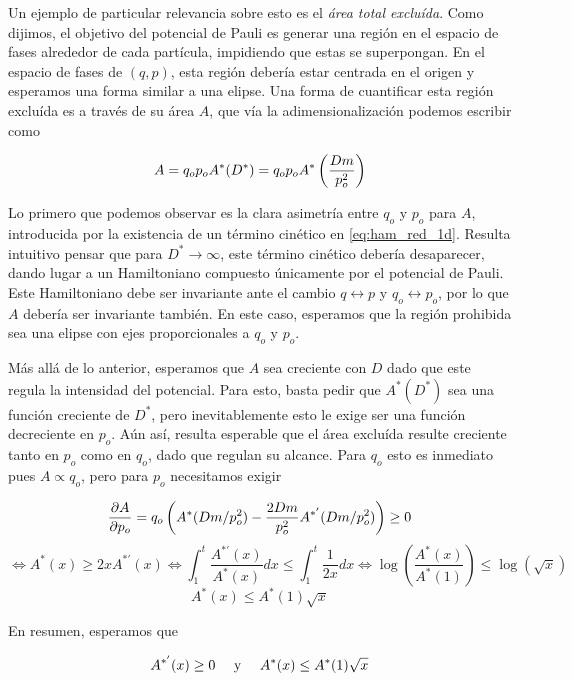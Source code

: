 Un ejemplo de particular relevancia sobre esto es el \textit{área total excluída}.
Como dijimos, el objetivo del potencial de Pauli es generar una región en el espacio de fases alrededor de cada partícula, impidiendo que estas se superpongan.
En el espacio de fases de $(q,p)$, esta región debería estar centrada en el origen y esperamos una forma similar a una elipse.
Una forma de cuantificar esta región excluída es a través de su área $A$, que vía la adimensionalización podemos escribir como

\begin{equation}{\label{eq:area_red}}
A = q_op_oA^*(D^*) = q_op_oA^*\left( \frac{Dm}{p_o^2} \right)
\end{equation}

Lo primero que podemos observar es la clara asimetría entre $q_o$ y $p_o$ para $A$, introducida por la existencia de un término cinético en \ref{eq:ham_red_1d}.
Resulta intuitivo pensar que para $D^*\to\infty$, este término cinético debería desaparecer, dando lugar a un Hamiltoniano compuesto únicamente por el potencial de Pauli.
Este Hamiltoniano debe ser invariante ante el cambio $q\leftrightarrow p$ y $q_o\leftrightarrow p_o$, por lo que $A$ debería ser invariante también.
En este caso, esperamos que la región prohibida sea una elipse con ejes proporcionales a $q_o$ y $p_o$.

Más allá de lo anterior, esperamos que $A$ sea creciente con $D$ dado que este regula la intensidad del potencial.
Para esto, basta pedir que $A^*(D^*)$ sea una función creciente de $D^*$, pero inevitablemente esto le exige ser una función decreciente en $p_o$.
Aún así, resulta esperable que el área excluída resulte creciente tanto en $p_o$ como en $q_o$, dado que regulan su alcance.
Para $q_o$ esto es inmediato pues $A\propto q_o$, pero para $p_o$ necesitamos exigir

\[ \frac{\partial A}{\partial p_o} = q_o\left( A^*(Dm/p_o^2) - \frac{2Dm}{p_o^2}A^{*'}(Dm/p_o^2) \right) \geq 0\]
\[ \Longleftrightarrow A^*(x) \geq 2x A^{*'}(x) \Longleftrightarrow  \int_1^t \frac{A^{*'}(x)}{A^*(x)}dx \leq \int_1^t\frac{1}{2x}dx \Longleftrightarrow \log{\left(\frac{A^*(x)}{A^*(1)}\right)} \leq \log{(\sqrt{x})} \]
\[ A^*(x) \leq A^*(1) \sqrt{x}\]

En resumen, esperamos que

\begin{equation}{\label{eq:props_area_red}}
A^{*'}(x)\geq 0 \quad \text{ y } \quad A^*(x)\leq A^*(1)\sqrt{x}
\end{equation}



